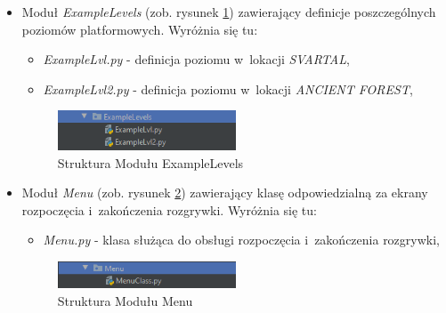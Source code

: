 \documentclass[12pt,a4paper,oneside]{book}
\theoremstyle{definition}
\numberwithin{equation}{chapter}
\begin{document}
\begin{itemize}
    \item Moduł \textit{ExampleLevels} (zob. rysunek \ref{StrukturaExampleLevels}) zawierający definicje poszczególnych poziomów platformowych. Wyróżnia się tu:
        \begin{itemize}
            \item \textit{ExampleLvl.py} - definicja poziomu w~lokacji \textit{SVARTAL},
            \item \textit{ExampleLvl2.py} - definicja poziomu w~lokacji \textit{ANCIENT FOREST},
        \end{itemize}
        \begin{figure}[hpt!]
            \centering
            \includegraphics[width=0.5\textwidth]{ProjectStructure/strukturaExampleLvl.png}
            \caption{Struktura Modułu ExampleLevels}
            \label{StrukturaExampleLevels}
        \end{figure}
    
        \item Moduł \textit{Menu} (zob. rysunek \ref{StrukturaMenu}) zawierający klasę odpowiedzialną za ekrany rozpoczęcia i~zakończenia rozgrywki. Wyróżnia się tu:
        \begin{itemize}
            \item \textit{Menu.py} - klasa służąca do obsługi rozpoczęcia i~zakończenia rozgrywki,
        \end{itemize}
        \begin{figure}[hpt!]
            \centering
            \includegraphics[width=0.5\textwidth]{ProjectStructure/strukturaMenu.png}
            \caption{Struktura Modułu Menu}
            \label{StrukturaMenu}
        \end{figure}
    

\end{itemize}
\end{document}
